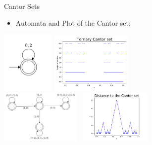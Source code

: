 \documentclass[leqno,presentation,usenames,dvipsnames]{beamer}
\begin{document}
\begin{frame}{Cantor Sets}

    \begin{itemize}
        \item Automata and Plot of the Cantor set:
    \end{itemize}

    \begin{center}
    \includegraphics[width=2.6cm]{FA20/images/fractals/cantor-automata.png}
    \includegraphics[width=3.9cm]{FA20/images/fractals/cantor3.pdf}\\
    \includegraphics[width=3.9cm]{FA20/images/fractals/cantord-automata.png}
    \includegraphics[width=3.9cm,height=2.6cm]{FA20/images/fractals/cantord.pdf}
    \end{center}
\end{frame}
\end{document}
